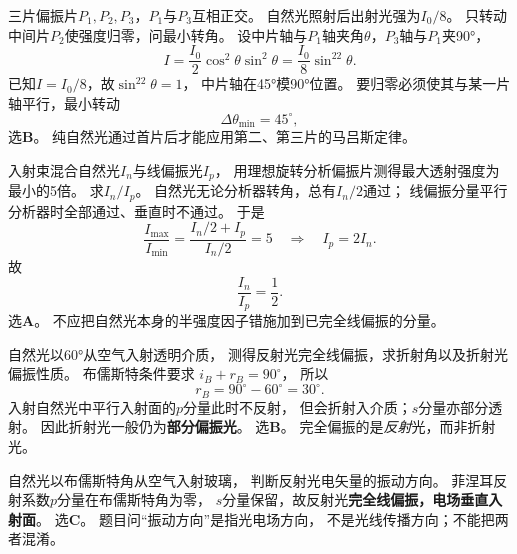 \problemtext 三片偏振片$P_1,P_2,P_3$，$P_1$与$P_3$互相正交。
自然光照射后出射光强为$I_0/8$。
只转动中间片$P_2$使强度归零，问最小转角。
\workings
设中片轴与$P_1$轴夹角$\theta$，$P_3$轴与$P_1$夹90°，
\[
 I=\frac{I_0}{2}\cos^2\theta\sin^2\theta
 =\frac{I_0}{8}\sin^22\theta.
\]
已知$I=I_0/8$，故$\sin^22\theta=1$，
中片轴在45°模90°位置。
要归零必须使其与某一片轴平行，最小转动
\[
\boxed{\Delta\theta_{\min}=45^\circ},
\]
选\textbf{B}。
\crosscheck 纯自然光通过首片后才能应用第二、第三片的马吕斯定律。

\problemtext 入射束混合自然光$I_n$与线偏振光$I_p$，
用理想旋转分析偏振片测得最大透射强度为最小的5倍。
求$I_n/I_p$。
\workings
自然光无论分析器转角，总有$I_n/2$通过；
线偏振分量平行分析器时全部通过、垂直时不通过。
于是
\[
\frac{I_{\max}}{I_{\min}}
=\frac{I_n/2+I_p}{I_n/2}=5
\quad\Longrightarrow\quad I_p=2I_n.
\]
故
\[
\boxed{\frac{I_n}{I_p}=\frac12}.
\]
选\textbf{A}。
\crosscheck 不应把自然光本身的半强度因子错施加到已完全线偏振的分量。

\problemtext 自然光以60°从空气入射透明介质，
测得反射光完全线偏振，求折射角以及折射光偏振性质。
\workings
布儒斯特条件要求
$i_B+r_B=90^\circ$，
所以
\[
\boxed{r_B=90^\circ-60^\circ=30^\circ}.
\]
入射自然光中平行入射面的$p$分量此时不反射，
但会折射入介质；$s$分量亦部分透射。
因此折射光一般仍为\textbf{部分偏振光}。
选\textbf{B}。
\crosscheck 完全偏振的是\emph{反射}光，而非折射光。

\problemtext 自然光以布儒斯特角从空气入射玻璃，
判断反射光电矢量的振动方向。
\workings
菲涅耳反射系数$p$分量在布儒斯特角为零，
$s$分量保留，故反射光\textbf{完全线偏振，电场垂直入射面}。
选\textbf{C}。
\crosscheck 题目问“振动方向”是指光电场方向，
不是光线传播方向；不能把两者混淆。
